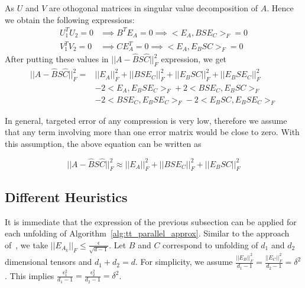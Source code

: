 \documentclass[runningheads]{llncs}
\begin{document}
\noindent As $U$ and $V$ are othogonal matrices in singular value decomposition of $A$. Hence we obtain the following expressions:
\begin{align*}
U_1^TU_2 = 0 & \implies B^TE_A = 0 \implies <E_A, BSE_C>_F = 0\\
V_1^TV_2 = 0 & \implies CE_A^T = 0 \implies <E_A, E_BSC>_F = 0 
\end{align*}
After putting these values in $||A - \hat{B}S\hat{C}||_F^2$ expression, we get
\begin{align*}
||A - \hat{B} S \hat{C}||_F^2 =& ||E_A||_F^2 + ||BSE_C||_F^2 + ||E_BSC||_F^2 + ||E_BSE_C||_F^2 \\
& -2 <E_A, E_BSE_C>_F + 2 <BSE_C, E_BSC>_F\\
& -2 <BSE_C, E_BSE_C>_F - 2<E_BSC, E_BSE_C>_F
\end{align*}

\noindent In general, targeted error of any compression is very low, therefore we assume that any term involving more than one error matrix would be close to zero. With this assumption, the above equation can be written as

\begin{equation*}
||A - \hat{B} S \hat{C}||_F^2 \approx ||E_A||_F^2 + ||BSE_C||_F^2 + ||E_BSC||_F^2
\end{equation*}

\subsection{Different Heuristics}
\label{sec:heuristics:all}

It is immediate that the expression of the previous subsection can be applied for each unfolding of Algorithm~\ref{alg:tt_parallel_approx}. Similar to the approach of~\cite{tt}, we take $||E_{A_k}||_F \le \frac{\epsilon}{\sqrt{d-1}}$. Let $B$ and $C$ correspond to unfolding of $d_1$ and $d_2$ dimensional tensors and $d_1 + d_2 = d$. For simplicity, we assume $\frac{||E_B||_F^2}{d_1-1} = \frac{||E_C||_F^2}{d_2-1} = \delta^2$. This implies $\frac{\epsilon_1^2}{d_1-1} = \frac{\epsilon_2^2}{d_2-1} = \delta^2$.
\end{document}
